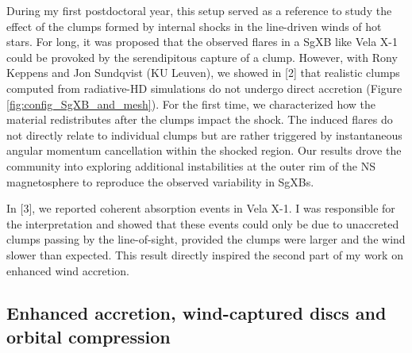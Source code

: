 \documentclass[letterpaper,12pt,onecolumn]{article}
\makeatletter
\newcommand{\sgx}{SgXB\xspace}
\newcommand{\sgxs}{SgXBs\xspace}
\newcommand*{\ns}{NS\@\xspace}
\makeatother
\begin{document}
During my first postdoctoral year, this setup served as a reference to study the effect of the clumps formed by internal shocks in the line-driven winds of hot stars. For long, it was proposed that the observed flares in a \sgx like Vela X-1 could be provoked by the serendipitous capture of a clump. However, with Rony Keppens and Jon Sundqvist (KU Leuven), we showed in [2] that realistic clumps computed from radiative-HD simulations do not undergo direct accretion (Figure\,\,\ref{fig:config_SgXB_and_mesh}). For the first time, we characterized how the material redistributes after the clumps impact the shock. The induced flares do not directly relate to individual clumps but are rather triggered by instantaneous angular momentum cancellation within the shocked region. Our results drove the community into exploring additional instabilities at the outer rim of the \ns magnetosphere to reproduce the observed variability in \sgxs.

In [3], we reported coherent absorption events in Vela X-1. I was responsible for the interpretation and showed that these events could only be due to unaccreted clumps passing by the line-of-sight, provided the clumps were larger and the wind slower than expected. This result directly inspired the second part of my work on enhanced wind accretion.





\subsection*{Enhanced accretion, wind-captured discs and orbital compression}
\end{document}
